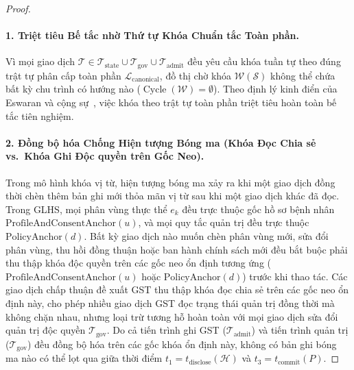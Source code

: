 \documentclass[11pt]{article}
\begin{document}
\begin{proof}
\paragraph{1. Triệt tiêu Bế tắc nhờ Thứ tự Khóa Chuẩn tắc Toàn phần.}
Vì mọi giao dịch $\mathcal{T} \in \mathcal{T}_{\text{state}} \cup \mathcal{T}_{\text{gov}} \cup \mathcal{T}_{\text{admit}}$ đều yêu cầu khóa tuần tự theo đúng trật tự phân cấp toàn phần $\mathcal{L}_{\text{canonical}}$, đồ thị chờ khóa $\mathcal{W}(\mathcal{S})$ không thể chứa bất kỳ chu trình có hướng nào ($\operatorname{Cycle}(\mathcal{W}) = \emptyset$). Theo định lý kinh điển của Eswaran và cộng sự~\cite{eswaran1976}, việc khóa theo trật tự toàn phần triệt tiêu hoàn toàn bế tắc tiên nghiệm.

\paragraph{2. Đồng bộ hóa Chống Hiện tượng Bóng ma (Khóa Đọc Chia sẻ vs.\ Khóa Ghi Độc quyền trên Gốc Neo).}
Trong mô hình khóa vị từ, hiện tượng bóng ma xảy ra khi một giao dịch đồng thời chèn thêm bản ghi mới thỏa mãn vị từ sau khi một giao dịch khác đã đọc. Trong GLHS, mọi phân vùng thực thể $e_k$ đều trực thuộc gốc hồ sơ bệnh nhân $\text{ProfileAndConsentAnchor}(u)$, và mọi quy tắc quản trị đều trực thuộc $\text{PolicyAnchor}(d)$. Bất kỳ giao dịch nào muốn chèn phân vùng mới, sửa đổi phân vùng, thu hồi đồng thuận hoặc ban hành chính sách mới đều bắt buộc phải thu thập khóa độc quyền trên các gốc neo ổn định tương ứng ($\text{ProfileAndConsentAnchor}(u)$ hoặc $\text{PolicyAnchor}(d)$) trước khi thao tác. Các giao dịch chấp thuận đề xuất GST thu thập khóa đọc chia sẻ trên các gốc neo ổn định này, cho phép nhiều giao dịch GST đọc trạng thái quản trị đồng thời mà không chặn nhau, nhưng loại trừ tương hỗ hoàn toàn với mọi giao dịch sửa đổi quản trị độc quyền $\mathcal{T}_{\text{gov}}$. Do cả tiến trình ghi GST ($\mathcal{T}_{\text{admit}}$) và tiến trình quản trị ($\mathcal{T}_{\text{gov}}$) đều đồng bộ hóa trên các gốc khóa ổn định này, không có bản ghi bóng ma nào có thể lọt qua giữa thời điểm $t_1 = t_{\text{disclose}}(\mathcal{H})$ và $t_3 = t_{\text{commit}}(P)$.


\end{proof}
\end{document}
